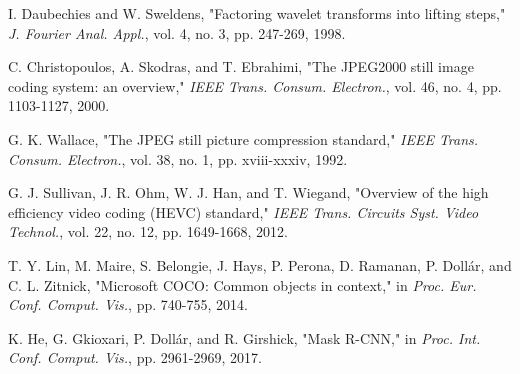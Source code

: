 \documentclass[conference]{IEEEtran}
\begin{document}
\begin{thebibliography}{00}
I. Daubechies and W. Sweldens, "Factoring wavelet transforms into lifting steps," \textit{J. Fourier Anal. Appl.}, vol. 4, no. 3, pp. 247-269, 1998.

C. Christopoulos, A. Skodras, and T. Ebrahimi, "The JPEG2000 still image coding system: an overview," \textit{IEEE Trans. Consum. Electron.}, vol. 46, no. 4, pp. 1103-1127, 2000.

G. K. Wallace, "The JPEG still picture compression standard," \textit{IEEE Trans. Consum. Electron.}, vol. 38, no. 1, pp. xviii-xxxiv, 1992.

G. J. Sullivan, J. R. Ohm, W. J. Han, and T. Wiegand, "Overview of the high efficiency video coding (HEVC) standard," \textit{IEEE Trans. Circuits Syst. Video Technol.}, vol. 22, no. 12, pp. 1649-1668, 2012.

T. Y. Lin, M. Maire, S. Belongie, J. Hays, P. Perona, D. Ramanan, P. Dollár, and C. L. Zitnick, "Microsoft COCO: Common objects in context," in \textit{Proc. Eur. Conf. Comput. Vis.}, pp. 740-755, 2014.

K. He, G. Gkioxari, P. Dollár, and R. Girshick, "Mask R-CNN," in \textit{Proc. Int. Conf. Comput. Vis.}, pp. 2961-2969, 2017.

\end{thebibliography}
\end{document}
